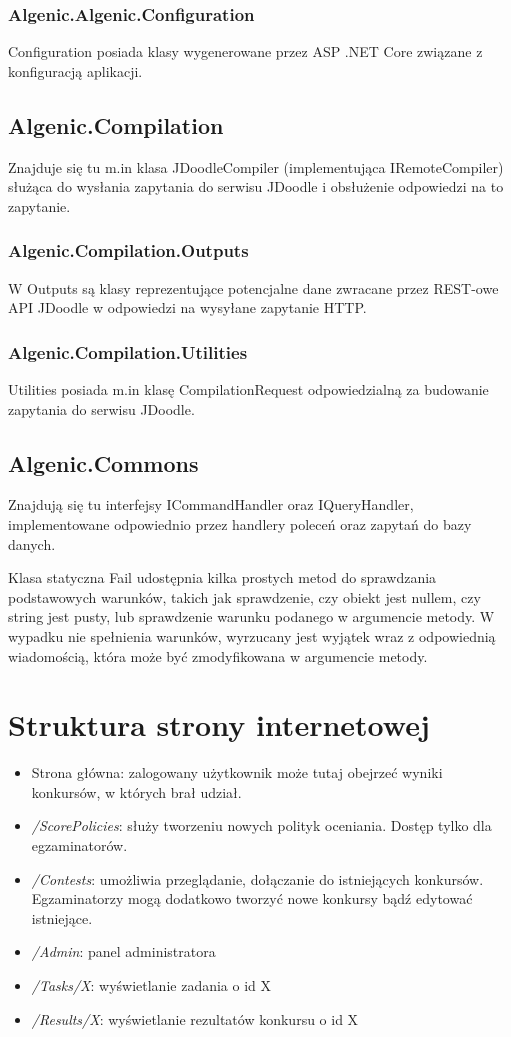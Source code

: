 \documentclass{article}
\begin{document}
\subsubsection{Algenic.Algenic.Configuration}
Configuration posiada klasy wygenerowane przez ASP .NET Core związane z konfiguracją aplikacji.

\subsection{Algenic.Compilation}
Znajduje się tu m.in klasa JDoodleCompiler (implementująca IRemoteCompiler) służąca do wysłania zapytania do serwisu JDoodle i obsłużenie odpowiedzi na to zapytanie.
\subsubsection{Algenic.Compilation.Outputs}
W Outputs są klasy reprezentujące potencjalne dane zwracane przez REST-owe API JDoodle w odpowiedzi na wysyłane zapytanie HTTP.
\subsubsection{Algenic.Compilation.Utilities}
Utilities posiada m.in klasę CompilationRequest odpowiedzialną za budowanie zapytania do serwisu JDoodle.

\subsection{Algenic.Commons}
Znajdują się tu interfejsy ICommandHandler oraz IQueryHandler, implementowane odpowiednio przez handlery poleceń oraz zapytań do bazy danych.

Klasa statyczna Fail udostępnia kilka prostych metod do sprawdzania podstawowych warunków, takich jak sprawdzenie, czy obiekt jest nullem, czy string jest pusty, lub sprawdzenie warunku podanego w argumencie metody. W wypadku nie spełnienia warunków, wyrzucany jest wyjątek wraz z odpowiednią wiadomością, która może być zmodyfikowana w argumencie metody.

\section{Struktura strony internetowej}
\begin{itemize}
    \item Strona główna: zalogowany użytkownik może tutaj obejrzeć wyniki konkursów, w których brał udział.
    \item \emph{/ScorePolicies}: służy tworzeniu nowych polityk oceniania. Dostęp tylko dla egzaminatorów.
    \item \emph{/Contests}: umożliwia przeglądanie, dołączanie do istniejących konkursów. Egzaminatorzy mogą dodatkowo tworzyć nowe konkursy bądź edytować istniejące.
    \item \emph{/Admin}: panel administratora
    \item \emph{/Tasks/X}: wyświetlanie zadania o id X
    \item \emph{/Results/X}: wyświetlanie rezultatów konkursu o id X
\end{itemize}
\end{document}
